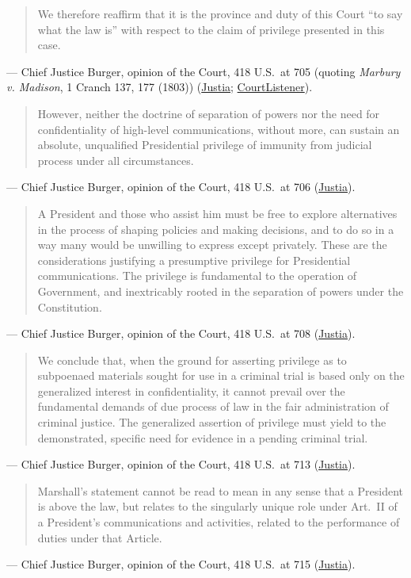 \documentclass[12pt]{article}
\begin{document}
\begin{quote}
We therefore reaffirm that it is the province and duty of this Court ``to say what the law is'' with respect to the claim of privilege presented in this case.
\end{quote}
\noindent --- Chief Justice Burger, opinion of the Court, 418 U.S.\ at 705 (quoting \textit{Marbury v. Madison}, 1 Cranch 137, 177 (1803)) (\href{https://supreme.justia.com/cases/federal/us/418/683/}{Justia}; \href{https://www.courtlistener.com/opinion/109101/united-states-v-nixon/}{CourtListener}).

\begin{quote}
However, neither the doctrine of separation of powers nor the need for confidentiality of high-level communications, without more, can sustain an absolute, unqualified Presidential privilege of immunity from judicial process under all circumstances.
\end{quote}
\noindent --- Chief Justice Burger, opinion of the Court, 418 U.S.\ at 706 (\href{https://supreme.justia.com/cases/federal/us/418/683/}{Justia}).

\begin{quote}
A President and those who assist him must be free to explore alternatives in the process of shaping policies and making decisions, and to do so in a way many would be unwilling to express except privately. These are the considerations justifying a presumptive privilege for Presidential communications. The privilege is fundamental to the operation of Government, and inextricably rooted in the separation of powers under the Constitution.
\end{quote}
\noindent --- Chief Justice Burger, opinion of the Court, 418 U.S.\ at 708 (\href{https://supreme.justia.com/cases/federal/us/418/683/}{Justia}).

\begin{quote}
We conclude that, when the ground for asserting privilege as to subpoenaed materials sought for use in a criminal trial is based only on the generalized interest in confidentiality, it cannot prevail over the fundamental demands of due process of law in the fair administration of criminal justice. The generalized assertion of privilege must yield to the demonstrated, specific need for evidence in a pending criminal trial.
\end{quote}
\noindent --- Chief Justice Burger, opinion of the Court, 418 U.S.\ at 713 (\href{https://supreme.justia.com/cases/federal/us/418/683/}{Justia}).

\begin{quote}
Marshall's statement cannot be read to mean in any sense that a President is above the law, but relates to the singularly unique role under Art.\ II of a President's communications and activities, related to the performance of duties under that Article.
\end{quote}
\noindent --- Chief Justice Burger, opinion of the Court, 418 U.S.\ at 715 (\href{https://supreme.justia.com/cases/federal/us/418/683/}{Justia}).
\end{document}
